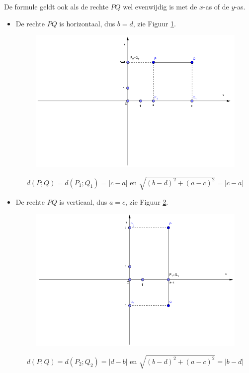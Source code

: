 De formule geldt ook als de rechte $PQ$ wel evenwijdig is met de $x$-as of de $y$-as.
\begin{itemize}
\item De rechte $PQ$ is horizontaal, dus $b=d$, zie Figuur \ref{fig4.2.3_fig2}.
\begin{figure}[!htb]
\begin{center}
\includegraphics[width=.7\linewidth]{4_opp_inhoud_an_meetk/inputs/AMTekst3Fig2}
\caption{}
\label{fig4.2.3_fig2}
\end{center}
\end{figure}
\[
d(P;Q)=d(P_1;Q_1)=\vert c-a \vert \text { en } \sqrt { (b-d)^2+(a-c)^2 }=\vert c-a \vert
\]
\item De rechte $PQ$ is verticaal, dus $a=c$, zie Figuur \ref{fig4.2.3_fig3}.
\begin{figure}[!htb]
\begin{center}
\includegraphics[width=.7\linewidth]{4_opp_inhoud_an_meetk/inputs/AMTekst3Fig3}
\caption{}
\label{fig4.2.3_fig3}
\end{center}
\end{figure}
\[
d(P;Q)=d(P_2;Q_2)=\vert d-b \vert \text { en } \sqrt { (b-d)^2+(a-c)^2 }=\vert b-d \vert
\]
\end{itemize}\vspace{2mm}

\newpage

